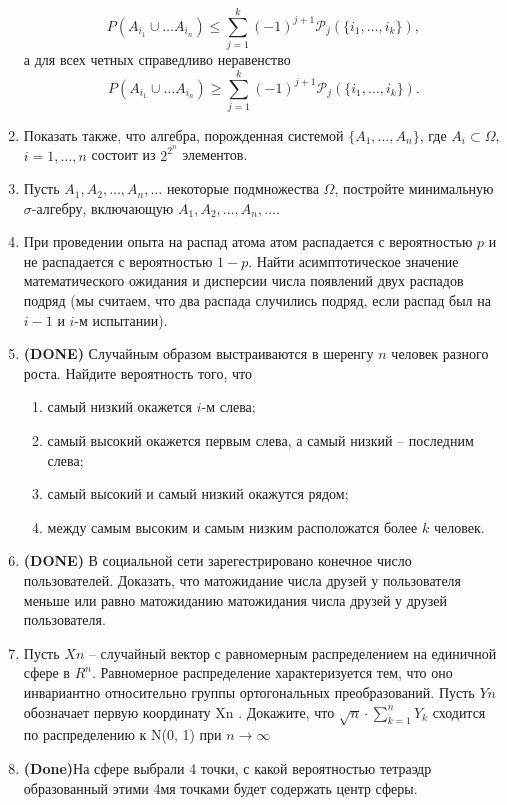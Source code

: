 \documentclass[a4paper, 14pt]{extarticle}
\begin{document}
\begin{enumerate}
	$$P(A_{i_1}\cup\ldots A_{i_n})\leq \sum_{j=1}^k(-1)^{j+1}\mathcal{P}_j(\{i_1,\ldots,i_k\}), $$ а для всех четных справедливо неравенство
	$$P(A_{i_1}\cup\ldots A_{i_n})\geq \sum_{j=1}^k(-1)^{j+1}\mathcal{P}_j(\{i_1,\ldots,i_k\}). $$ 	\item Показать также, что алгебра, порожденная системой
	$\{A_1,\ldots, A_n\}$, где $A_i\subset\Omega$, $i = 1,\ldots, n$ состоит из $2^{2^n}$ элементов.
	\item Пусть $A_1,A_2,\ldots, A_n,\ldots$ некоторые подмножества $\Omega$, постройте минимальную $\sigma$-алгебру, включающую $A_1,A_2,\ldots, A_n,\ldots$.
	\item При проведении опыта на распад атома атом распадается с вероятностью $p$ и не распадается с вероятностью $1-p$. Найти асимптотическое значение математического ожидания и дисперсии числа появлений двух распадов подряд (мы считаем, что два распада случились подряд, если распад был на $i-1$ и $i$-м испытании).
	
\item \textbf{(DONE)} Случайным образом выстраиваются в шеренгу $n$ человек разного
роста. Найдите вероятность того, что
\begin{enumerate}
	\item самый низкий окажется $i$-м слева;
	\item самый высокий окажется первым слева, а самый низкий -- последним слева;
	\item самый высокий и самый низкий окажутся рядом;
	\item между самым высоким и самым низким расположатся более $k$
человек.
\end{enumerate}

\item \textbf{(DONE)} В социальной сети зарегестрировано конечное число пользователей. 
Доказать, что матожидание числа друзей у пользователя меньше или равно матожиданию матожидания числа друзей у друзей пользователя. 

\item Пусть $Xn$ – случайный вектор с равномерным распределением на единичной сфере в $R^n$.
Равномерное распределение характеризуется тем, что оно инвариантно относительно группы ортогональных преобразований. 
Пусть $Yn$ обозначает первую координату Xn . Докажите, что $\sqrt{n} \cdot \sum_{k=1}^{n} Y_k$ сходится по распределению к N(0, 1) при $n \to \infty$

\item \textbf{(Done)}На сфере выбрали 4 точки, с какой вероятностью тетраэдр образованный этими 4мя точками будет содержать центр сферы.

\end{enumerate}
\end{document}
